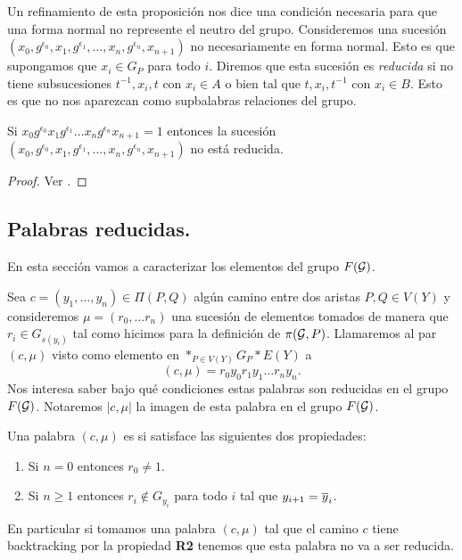 \documentclass[tesis.tex]{subfiles}
\begin{document}
Un refinamiento de esta proposición nos dice una condición necesaria para que una forma normal no represente el neutro del grupo.
Consideremos una sucesión $(x_{0},g^{\epsilon_0},x_{1},g^{\epsilon_1}, \dots, x_{n},g^{\epsilon_n},x_{n+1})$ no necesariamente en forma normal. 
Esto es que supongamos que $x_i \in G_P$ para todo $i$.
Diremos que esta sucesión es \emph{reducida} si no tiene subsucesiones $t^{-1},x_i,t$ con $x_i \in A$ o bien tal que $t,x_i,t^{-1}$ con $x_i \in B$.
Esto es que no nos aparezcan como supbalabras relaciones del grupo.

\begin{teo}[Britton]\label{teo_britton}
	Si $x_{0}g^{\epsilon_0}x_{1}g^{\epsilon_1} \dots x_{n}g^{\epsilon_n}x_{n+1} = 1$ entonces la sucesión $(x_{0},g^{\epsilon_0},x_{1},g^{\epsilon_1}, \dots, x_{n},g^{\epsilon_n},x_{n+1})$ no está reducida.
\end{teo}
\begin{proof}
	Ver \cite{lyndon1977combinatorial}.
\end{proof}
\subsection{Palabras reducidas.}

En esta sección vamos a caracterizar los elementos del grupo $F({\cal G})$.

Sea $c=(y_1, \dots, y_n) \in \Pi(P,Q)$ algún camino entre dos aristas $P,Q \in V(Y)$ y consideremos $\mu = (r_0, \dots r_n)$ una sucesión de elementos tomados de manera que $r_i \in G_{s(y_i)}$ tal como hicimos para la definición de $\pi({\cal G}, P)$.
Llamaremos al par $(c, \mu)$ visto como elemento en $\ast_{P \in V(Y)}G_P \ast E(Y)$ a 
\[
(c,\mu) = r_0 y_0 r_1 y_1 \dots r_n y_n.
\]
Nos interesa saber bajo qué condiciones estas palabras son reducidas en el grupo $F({\cal G})$.
Notaremos $|c,\mu|$ la imagen de esta palabra en el grupo $F({\cal G})$.

\begin{deff}
	Una palabra $(c, \mu)$ es  si satisface las siguientes dos propiedades:
	\begin{enumerate}[R1.]
		\item Si $n=0$ entonces $r_0 \neq 1$.
		\item Si $n \ge 1$ entonces $r_i \notin G_{y_i}$ para todo $i$ tal que $y_{i+1} = \overline y_{i}$.
	\end{enumerate}
\end{deff}
En particular si tomamos una palabra $(c, \mu)$ tal que el camino $c$ tiene backtracking por la propiedad \textbf{R2} tenemos que esta palabra no va a ser reducida.
\end{document}
